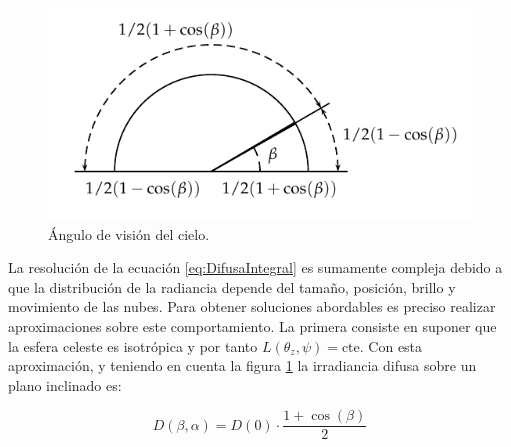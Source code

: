 %
\begin{figure}
  \includegraphics{../figs/AnguloVisionCielo}

  \caption{Ángulo de visión del cielo.\label{fig:RegionVisibleCielo}}

\end{figure}


La resolución de la ecuación \ref{eq:DifusaIntegral} es sumamente
compleja debido a que la distribución de la radiancia depende del
tamaño, posición, brillo y movimiento de las nubes. Para obtener
soluciones abordables es preciso realizar aproximaciones sobre este
comportamiento.  La primera consiste en suponer que la esfera celeste
es isotrópica y por tanto $L(\theta_{z},\psi)=\mathrm{cte}$. Con esta
aproximación, y teniendo en cuenta la figura
\ref{fig:RegionVisibleCielo} la irradiancia difusa sobre un plano
inclinado es:

\begin{equation}
  D(\beta,\alpha)=D(0)\cdot\frac{1+\cos(\beta)}{2}\label{eq:DifusaIsotropica}\end{equation}


